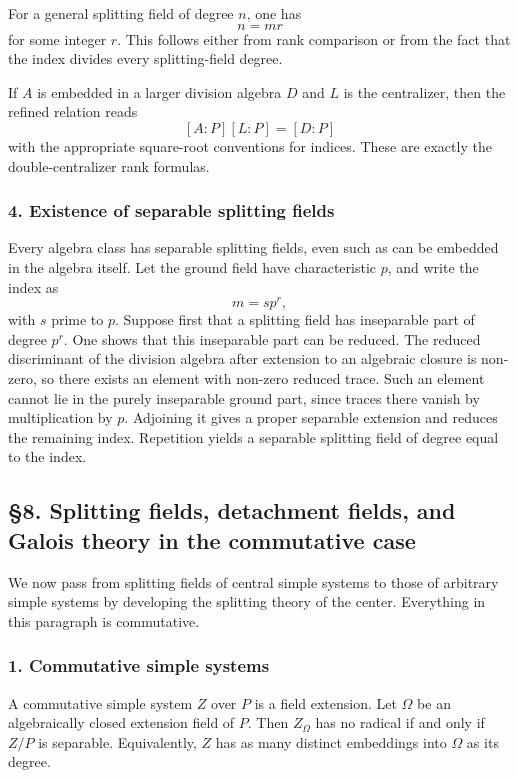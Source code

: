 \documentclass[
  11pt,
]{article}
\begin{document}
For a general splitting field of degree \(n\), one has \[
  n=mr
\] for some integer \(r\). This follows either from rank comparison or
from the fact that the index divides every splitting-field degree.

If \(A\) is embedded in a larger division algebra \(D\) and \(L\) is the
centralizer, then the refined relation reads \[
  [A:P][L:P]=[D:P]
\] with the appropriate square-root conventions for indices. These are
exactly the double-centralizer rank formulas.

\subsubsection{4. Existence of separable splitting
fields}\label{existence-of-separable-splitting-fields}

Every algebra class has separable splitting fields, even such as can be
embedded in the algebra itself. Let the ground field have characteristic
\(p\), and write the index as \[
  m=s p^r,
\] with \(s\) prime to \(p\). Suppose first that a splitting field has
inseparable part of degree \(p^r\). One shows that this inseparable part
can be reduced. The reduced discriminant of the division algebra after
extension to an algebraic closure is non-zero, so there exists an
element with non-zero reduced trace. Such an element cannot lie in the
purely inseparable ground part, since traces there vanish by
multiplication by \(p\). Adjoining it gives a proper separable extension
and reduces the remaining index. Repetition yields a separable splitting
field of degree equal to the index.

\subsection{§8. Splitting fields, detachment fields, and Galois theory
in the commutative
case}\label{splitting-fields-detachment-fields-and-galois-theory-in-the-commutative-case}

We now pass from splitting fields of central simple systems to those of
arbitrary simple systems by developing the splitting theory of the
center. Everything in this paragraph is commutative.

\subsubsection{1. Commutative simple
systems}\label{commutative-simple-systems}

A commutative simple system \(Z\) over \(P\) is a field extension. Let
\(\Omega\) be an algebraically closed extension field of \(P\). Then
\(Z_\Omega\) has no radical if and only if \(Z/P\) is separable.
Equivalently, \(Z\) has as many distinct embeddings into \(\Omega\) as
its degree.
\end{document}
